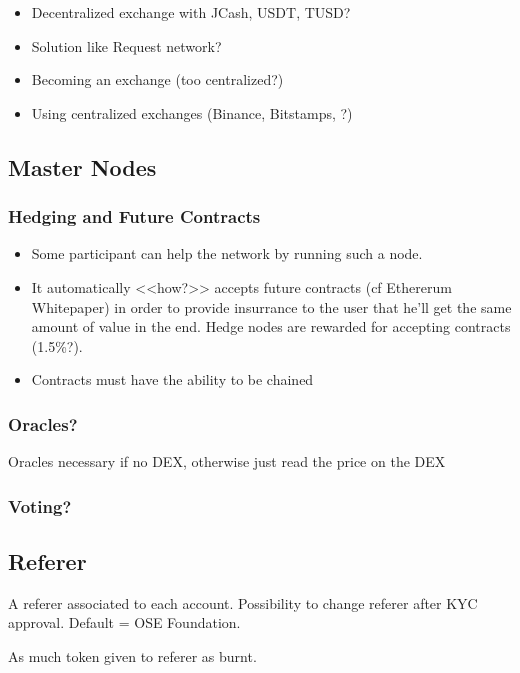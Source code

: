 \documentclass[a4paper]{article}
\begin{document}
\begin{itemize}
\item Decentralized exchange with JCash, USDT, TUSD?
\item Solution like Request network?
\item Becoming an exchange (too centralized?)
\item Using centralized exchanges (Binance, Bitstamps, ?)
\end{itemize}

\subsection{Master Nodes}

\subsubsection{Hedging and Future Contracts}

\begin{itemize}
\item Some participant can help the network by running such a node.
\item It automatically <<how?>> accepts future contracts (cf Ethererum Whitepaper) in order to provide insurrance to the user that he'll get the same amount of value in the end. Hedge nodes are rewarded for accepting contracts (1.5\%?).
\item Contracts must have the ability to be chained
\end{itemize}

\subsubsection{Oracles?}

Oracles necessary if no DEX, otherwise just read the price on the DEX

\subsubsection{Voting?}



\subsection{Referer}

A referer associated to each account.
Possibility to change referer after KYC approval.
Default = OSE Foundation.

As much token given to referer as burnt.
\end{document}
